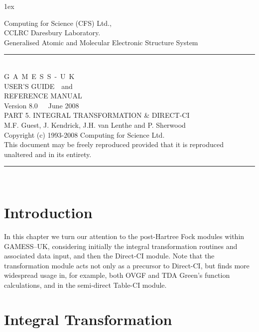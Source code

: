\documentclass[11pt,fleqn]{article}
\begin{document}
\sf
\parindent 0cm
\parskip 1ex
\begin{flushleft}
 
Computing for Science (CFS) Ltd.,\\CCLRC Daresbury Laboratory.\\[0.30in]
{\large Generalised Atomic and Molecular Electronic Structure System }\\[.2in]
\rule{150mm}{3mm}\\
\vspace{.2in}
{\huge G~A~M~E~S~S~-~U~K}\\[.3in]
{\huge USER'S GUIDE~~and}\\[.2in]
{\huge REFERENCE MANUAL}\\[0.2in]
{\huge Version 8.0~~~June 2008}\\ [.2in]
{\large PART 5. INTEGRAL TRANSFORMATION \& DIRECT-CI}\\
\vspace{.1in}
{\large M.F. Guest, J. Kendrick, J.H. van Lenthe and P. Sherwood}\\[0.2in]
 
Copyright (c) 1993-2008 Computing for Science Ltd.\\[.1in]
This document may be freely reproduced provided that it is reproduced\\
unaltered and in its entirety.\\
\vspace{.2in}
\rule{150mm}{5mm}\\
\end{flushleft}


\tableofcontents

\newpage


\section[Introduction]{Introduction}

In this chapter we turn our attention to the post-Hartree Fock modules
within GAMESS--UK, considering initially the integral transformation
routines and associated data input, and then the Direct-CI module.
Note that the transformation module acts not only as a precursor to
Direct-CI, but finds more widespread usage in, for example, both OVGF
and TDA Green's function calculations, and in the semi-direct Table-CI
module.

\section[Integral Transformation]{Integral Transformation}
\end{document}
